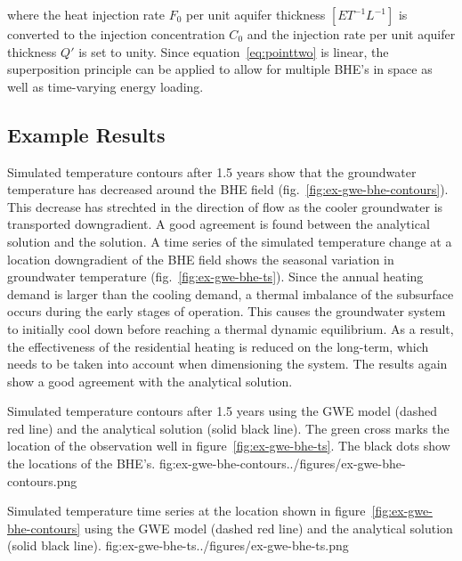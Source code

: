 where the heat injection rate $F_0$ per unit aquifer thickness $[ET^{-1}L^{-1}]$ is converted to the injection concentration $C_0$ and the injection rate per unit aquifer thickness $Q'$ is set to unity. Since equation~\ref{eq:pointtwo} is linear, the superposition principle can be applied to allow for multiple BHE's in space as well as time-varying energy loading.

\subsection{Example Results}

Simulated temperature contours after 1.5 years show that the groundwater temperature has decreased around the BHE field (fig.~\ref{fig:ex-gwe-bhe-contours}). This decrease has strechted in the direction of flow as the cooler groundwater is transported downgradient. A good agreement is found between the analytical solution and the \mf solution. A time series of the simulated temperature change at a location downgradient of the BHE field shows the seasonal variation in groundwater temperature (fig.~\ref{fig:ex-gwe-bhe-ts}). Since the annual heating demand is larger than the cooling demand, a thermal imbalance of the subsurface occurs during the early stages of operation. This causes the groundwater system to initially cool down before reaching a thermal dynamic equilibrium. As a result, the effectiveness of the residential heating is reduced on the long-term, which needs to be taken into account when dimensioning the system. The \mf results again show a good agreement with the analytical solution.

\begin{StandardFigure}{
    Simulated temperature contours after 1.5 years using the \mf GWE model (dashed red line) and the analytical solution (solid black line). The green cross marks the location of the observation well in figure~\ref{fig:ex-gwe-bhe-ts}. The black dots show the locations of the BHE's.
    }{fig:ex-gwe-bhe-contours}{../figures/ex-gwe-bhe-contours.png}
\end{StandardFigure}                                 

\begin{StandardFigure}{
    Simulated temperature time series at the location shown in figure~\ref{fig:ex-gwe-bhe-contours} using the \mf GWE model (dashed red line) and the analytical solution (solid black line). 
    }{fig:ex-gwe-bhe-ts}{../figures/ex-gwe-bhe-ts.png}
\end{StandardFigure}    

